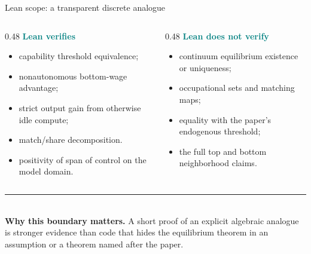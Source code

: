 \documentclass[aspectratio=169,11pt]{beamer}
\newcommand{\key}[1]{\textcolor{Teal}{\textbf{#1}}}
\begin{document}
\begin{frame}{Lean scope: a transparent discrete analogue}
\small
\begin{columns}[T,totalwidth=\textwidth]
\begin{column}{0.48\textwidth}
  \key{Lean verifies}
  \begin{itemize}\setlength\itemsep{0.10cm}
    \item capability threshold equivalence;
    \item nonautonomous bottom-wage advantage;
    \item strict output gain from otherwise idle compute;
    \item match/share decomposition.
    \item positivity of span of control on the model domain.
  \end{itemize}
\end{column}
\begin{column}{0.48\textwidth}
  \key{Lean does not verify}
  \begin{itemize}\setlength\itemsep{0.10cm}
    \item continuum equilibrium existence or uniqueness;
    \item occupational sets and matching maps;
    \item equality with the paper's endogenous threshold;
    \item the full top and bottom neighborhood claims.
  \end{itemize}
\end{column}
\end{columns}

\vfill
{\color{Coral}\rule{\textwidth}{0.8pt}}\\[-0.02cm]
\textbf{Why this boundary matters.} A short proof of an explicit algebraic
analogue is stronger evidence than code that hides the equilibrium theorem in
an assumption or a theorem named after the paper.
\end{frame}
\end{document}
